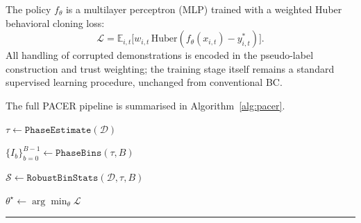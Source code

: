 \documentclass[a4paper, 10pt, conference]{ieeeconf}
\begin{document}
The policy $f_\theta$ is a multilayer perceptron (MLP) trained with a weighted Huber behavioral cloning loss:
\begin{equation}
    \mathcal{L} = \mathbb{E}_{i,t}\!\bigl[w_{i,t}\,\mathrm{Huber}(f_\theta(x_{i,t}) - y^*_{i,t})\bigr].
\end{equation}
All handling of corrupted demonstrations is encoded in the pseudo-label construction and trust weighting; the training stage itself remains a standard supervised learning procedure, unchanged from conventional BC.\@

The full PACER pipeline is summarised in Algorithm~\ref{alg:pacer}.

\begin{algorithm}[p]
    \caption{PACER:\@ Progress Aligned Curation for Error Resilient Imitation Learning}\label{alg:pacer}
    \small


    $\tau \leftarrow \texttt{PhaseEstimate}(\mathcal{D})$

    ${\{I_b\}}_{b=0}^{B-1} \leftarrow \texttt{PhaseBins}(\tau,B)$

    $\mathcal{S} \leftarrow \texttt{RobustBinStats}(\mathcal{D},\tau,B)$

    \BlankLine{}


    $\theta^\star \leftarrow \arg\min_{\theta}\mathcal{L}$


    \BlankLine{}
    \hrule
    \BlankLine{}



\end{algorithm}
\end{document}
